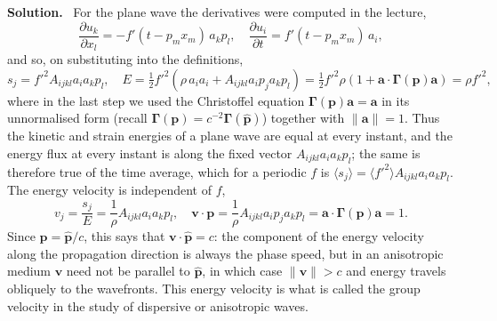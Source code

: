 \documentclass[a4paper,12pt]{paper}
\newenvironment{solution}{\par\noindent\textbf{Solution.}\ }{\par\medskip}
\begin{document}
\begin{solution}
For the plane wave the derivatives were computed in the lecture,
\begin{equation}
\frac{\partial u_{k}}{\partial x_{l}}=-f'(t-p_{m}x_{m})\,a_{k}p_{l},\quad
\frac{\partial u_{i}}{\partial t}=f'(t-p_{m}x_{m})\,a_{i},
\label{eq:33}
\end{equation}
and so, on substituting into the definitions,
\begin{equation}
s_{j}=f'^{2}A_{ijkl}a_{i}a_{k}p_{l},\quad
E=\tfrac{1}{2}f'^{2}\left(\rho\,a_{i}a_{i}+A_{ijkl}a_{i}p_{j}a_{k}p_{l}\right)
=\tfrac{1}{2}f'^{2}\rho\left(1+\mathbf{a}\cdot\bm{\Gamma}(\mathbf{p})\mathbf{a}\right)=\rho f'^{2},
\label{eq:34}
\end{equation}
where in the last step we used the Christoffel equation
$\bm{\Gamma}(\mathbf{p})\mathbf{a}=\mathbf{a}$ in its unnormalised form (recall
$\bm{\Gamma}(\mathbf{p})=c^{-2}\bm{\Gamma}(\hat{\mathbf{p}})$) together with $\|\mathbf{a}\|=1$.
Thus the kinetic and strain energies of a plane wave are equal at every instant, and the
energy flux at every instant is along the fixed vector $A_{ijkl}a_{i}a_{k}p_{l}$; the same is
therefore true of the time average, which for a periodic $f$ is $\langle s_{j}\rangle=\langle f'^{2}\rangle A_{ijkl}a_{i}a_{k}p_{l}$.
The energy velocity is independent of $f$,
\begin{equation}
v_{j}=\frac{s_{j}}{E}=\frac{1}{\rho}A_{ijkl}a_{i}a_{k}p_{l},\quad
\mathbf{v}\cdot\mathbf{p}=\frac{1}{\rho}A_{ijkl}a_{i}p_{j}a_{k}p_{l}=\mathbf{a}\cdot\bm{\Gamma}(\mathbf{p})\mathbf{a}=1.
\label{eq:35}
\end{equation}
Since $\mathbf{p}=\hat{\mathbf{p}}/c$, this says that $\mathbf{v}\cdot\hat{\mathbf{p}}=c$: the
component of the energy velocity along the propagation direction is always the phase speed,
but in an anisotropic medium $\mathbf{v}$ need not be parallel to $\hat{\mathbf{p}}$, in which
case $\|\mathbf{v}\|>c$ and energy travels obliquely to the wavefronts. This energy velocity is
what is called the group velocity in the study of dispersive or anisotropic waves.


\end{solution}
\end{document}
